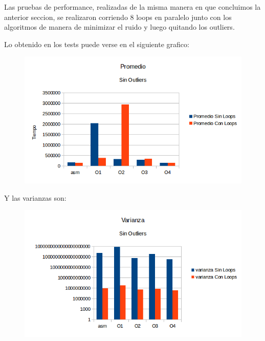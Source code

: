 \documentclass[a4paper]{article}
\begin{document}
Las pruebas de performance, realizadas de la misma manera en que concluimos la anterior seccion, se realizaron corriendo 8 loops en paralelo junto con los algoritmos de manera de minimizar el ruido y luego quitando los outliers.

Lo obtenido en los tests puede verse en el siguiente grafico:

\begin{figure}[h!]
  \begin{center}
	\includegraphics[scale=0.66]{GraficosTesting/crop/PSO.png}
	\label{nombreparareferenciar5}
  \end{center}
\end{figure}

Y las varianzas son:

\begin{figure}[h!]
  \begin{center}
	\includegraphics[scale=0.66]{GraficosTesting/crop/VSO.png}
	\label{nombreparareferenciar6}
  \end{center}
\end{figure}
\end{document}
